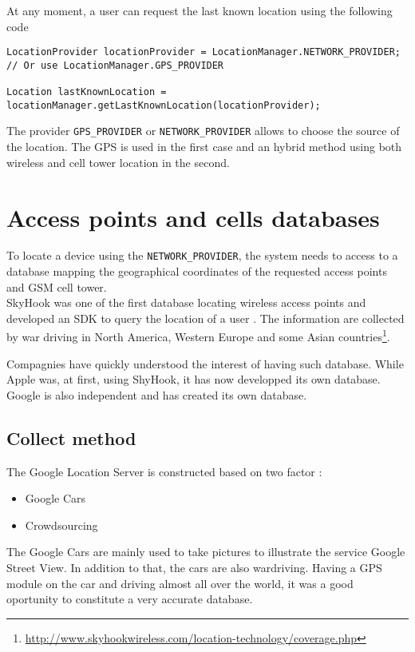 \documentclass{report}
\begin{document}
At any moment, a user can request the last known location using the following code

\begin{lstlisting}[label=getLastKnown,caption=Get the last recorded location]
LocationProvider locationProvider = LocationManager.NETWORK_PROVIDER;
// Or use LocationManager.GPS_PROVIDER

Location lastKnownLocation = locationManager.getLastKnownLocation(locationProvider);
\end{lstlisting}

The provider \texttt{GPS\_PROVIDER}  or \texttt{NETWORK\_PROVIDER} allows to choose the source of the location. The GPS is used in the first case and an hybrid method using both wireless and cell tower location in the second.

\section{Access points and cells databases}
To locate a device using the \texttt{NETWORK\_PROVIDER}, the system needs to access to a database mapping the geographical coordinates of the requested access points and GSM cell tower.\\

SkyHook was one of the first database locating wireless access points and developed an SDK to query the location of a user .
The information are collected by war driving in North America, Western Europe and some Asian countries\footnote{\url{http://www.skyhookwireless.com/location-technology/coverage.php}}.

Compagnies have quickly understood the interest of having such database.
While Apple was, at first, using ShyHook, it has now developped its own database. Google is also independent and has created its own database.

\subsection{Collect method}
The Google Location Server is constructed based on two factor :
\begin{itemize}
\item Google Cars
\item Crowdsourcing
\end{itemize}

The Google Cars are mainly used to take pictures to illustrate the service Google Street View. In addition to that, the cars are also wardriving.  Having a GPS module on the car and driving almost all over the world, it was a good oportunity to constitute a very accurate database.\\
\end{document}
